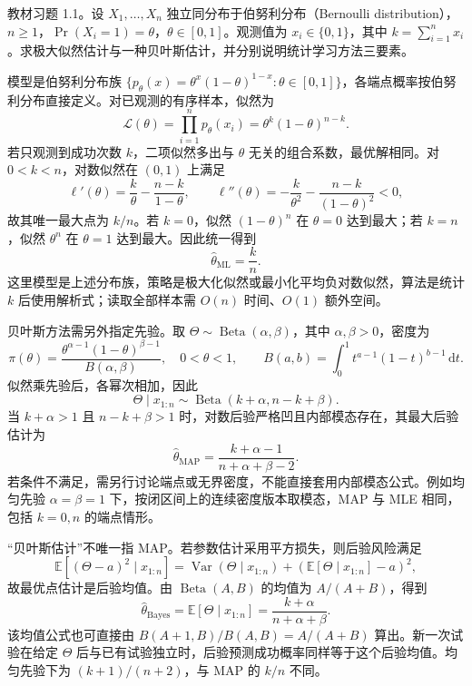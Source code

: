 \begin{example}
\label{ex:lh-bernoulli-estimation}
教材习题 1.1。设 $X_1,\ldots,X_n$ 独立同分布于伯努利分布（Bernoulli distribution），$n\geq1$，$\Pr(X_i=1)=\theta$，$\theta\in[0,1]$。观测值为 $x_i\in\{0,1\}$，其中 $k=\sum_{i=1}^n x_i$。求极大似然估计与一种贝叶斯估计，并分别说明统计学习方法三要素。
\end{example}
\begin{solve}
模型是伯努利分布族 $\{p_\theta(x)=\theta^x(1-\theta)^{1-x}:\theta\in[0,1]\}$，各端点概率按伯努利分布直接定义。对已观测的有序样本，似然为
\[
    \mathcal L(\theta)=\prod_{i=1}^n p_\theta(x_i)
       =\theta^k(1-\theta)^{n-k}.
\]
若只观测到成功次数 $k$，二项似然多出与 $\theta$ 无关的组合系数，最优解相同。对 $0<k<n$，对数似然在 $(0,1)$ 上满足
\[
    \ell'(\theta)=\frac{k}{\theta}-\frac{n-k}{1-\theta},
    \qquad
    \ell''(\theta)=-\frac{k}{\theta^2}
                     -\frac{n-k}{(1-\theta)^2}<0,
\]
故其唯一最大点为 $k/n$。若 $k=0$，似然 $(1-\theta)^n$ 在 $\theta=0$ 达到最大；若 $k=n$，似然 $\theta^n$ 在 $\theta=1$ 达到最大。因此统一得到
\begin{equation}
    \widehat\theta_{\mathrm{ML}}=\frac{k}{n}.
    \label{eq:lh-bernoulli-mle}
\end{equation}
这里模型是上述分布族，策略是极大化似然或最小化平均负对数似然，算法是统计 $k$ 后使用解析式；读取全部样本需 $O(n)$ 时间、$O(1)$ 额外空间。

贝叶斯方法需另外指定先验。取 $\Theta\sim\operatorname{Beta}(\alpha,\beta)$，其中 $\alpha,\beta>0$，密度为
\[
    \pi(\theta)=\frac{\theta^{\alpha-1}(1-\theta)^{\beta-1}}
                         {B(\alpha,\beta)},\quad 0<\theta<1,
    \qquad
    B(a,b)=\int_0^1 t^{a-1}(1-t)^{b-1}\,\mathrm dt.
\]
似然乘先验后，各幂次相加，因此
\begin{equation}
    \Theta\mid x_{1:n}\sim\operatorname{Beta}(k+\alpha,n-k+\beta).
    \label{eq:lh-bernoulli-posterior}
\end{equation}
当 $k+\alpha>1$ 且 $n-k+\beta>1$ 时，对数后验严格凹且内部模态存在，其最大后验估计为
\begin{equation}
    \widehat\theta_{\mathrm{MAP}}
       =\frac{k+\alpha-1}{n+\alpha+\beta-2}.
    \label{eq:lh-bernoulli-map}
\end{equation}
若条件不满足，需另行讨论端点或无界密度，不能直接套用内部模态公式。例如均匀先验 $\alpha=\beta=1$ 下，按闭区间上的连续密度版本取模态，MAP 与 MLE 相同，包括 $k=0,n$ 的端点情形。

“贝叶斯估计”不唯一指 MAP。若参数估计采用平方损失，则后验风险满足
\[
    \mathbb E[(\Theta-a)^2\mid x_{1:n}]
       =\operatorname{Var}(\Theta\mid x_{1:n})
          +(\mathbb E[\Theta\mid x_{1:n}]-a)^2,
\]
故最优点估计是后验均值。由 $\operatorname{Beta}(A,B)$ 的均值为 $A/(A+B)$，得到
\begin{equation}
    \widehat\theta_{\mathrm{Bayes}}
       =\mathbb E[\Theta\mid x_{1:n}]
       =\frac{k+\alpha}{n+\alpha+\beta}.
    \label{eq:lh-bernoulli-posterior-mean}
\end{equation}
该均值公式也可直接由 $B(A+1,B)/B(A,B)=A/(A+B)$ 算出。新一次试验在给定 $\Theta$ 后与已有试验独立时，后验预测成功概率同样等于这个后验均值。均匀先验下为 $(k+1)/(n+2)$，与 MAP 的 $k/n$ 不同。


\end{solve}
